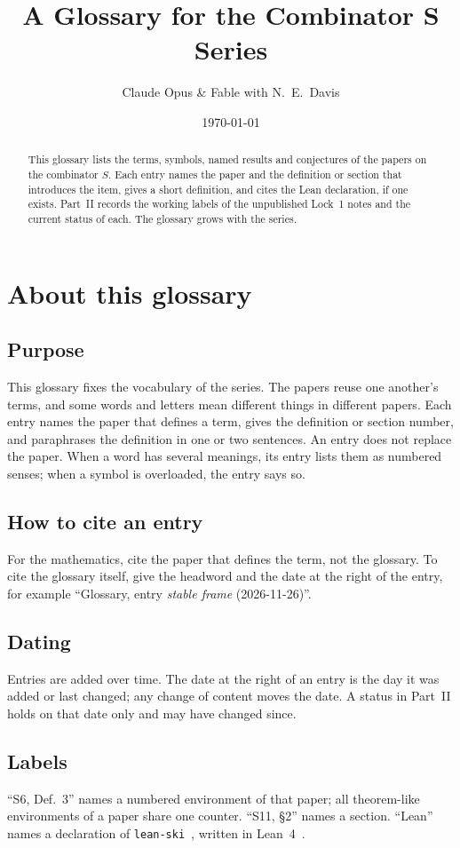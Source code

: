 \documentclass[11pt]{amsart}
\title[A Glossary for the Combinator $S$ Series]{A Glossary for the Combinator $\bm{S}$ Series}
\author{Claude Opus \& Fable with N.\ E.\ Davis}
\date{\today}
\newcounter{sense}
\begin{document}
\begin{abstract}
This glossary lists the terms, symbols, named results and conjectures of the papers on the
combinator $S$. Each entry names the paper and the definition or section that introduces the item,
gives a short definition, and cites the Lean declaration, if one exists. Part~II records the working
labels of the unpublished Lock~1 notes and the current status of each. The glossary grows with the
series.
\end{abstract}
\maketitle

\section*{About this glossary}

\subsection*{Purpose}
This glossary fixes the vocabulary of the series. The papers reuse one another's terms, and some
words and letters mean different things in different papers. Each entry names the paper that
defines a term, gives the definition or section number, and paraphrases the definition in one or two
sentences. An entry does not replace the paper. When a word has several meanings, its entry lists
them as numbered senses; when a symbol is overloaded, the entry says so.

\subsection*{How to cite an entry}
For the mathematics, cite the paper that defines the term, not the glossary. To cite the glossary
itself, give the headword and the date at the right of the entry, for example ``Glossary, entry
\emph{stable frame} (2026-11-26)''.

\subsection*{Dating}
Entries are added over time. The date at the right of an entry is the day it was added or last
changed; any change of content moves the date. A status in Part~II holds on that date only and may
have changed since.

\subsection*{Labels}
``S6, Def.~3'' names a numbered environment of that paper; all theorem-like environments of a paper
share one counter. ``S11, \S2'' names a section. ``Lean'' names a declaration of
\texttt{lean-ski}~\citep{leanski}, written in Lean~4~\citep{lean4}.
\end{document}
